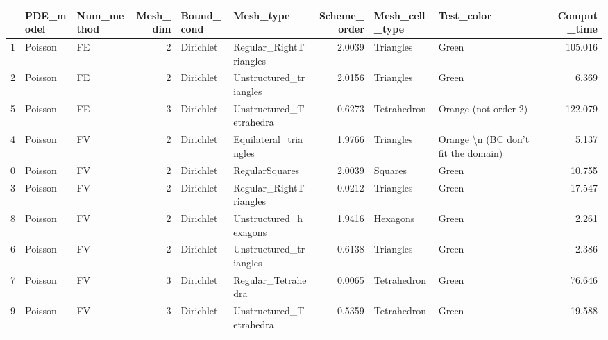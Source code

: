 \begin{tabular}{lllrllrllr}
\toprule
{} & PDE\_model & Num\_method &  Mesh\_dim & Bound\_cond &                Mesh\_type &  Scheme\_order & Mesh\_cell\_type &                           Test\_color &  Comput\_time \\
\midrule
1 &   Poisson &         FE &         2 &  Dirichlet &   Regular\_RightTriangles &        2.0039 &      Triangles &                                Green &      105.016 \\
2 &   Poisson &         FE &         2 &  Dirichlet &   Unstructured\_triangles &        2.0156 &      Triangles &                                Green &        6.369 \\
5 &   Poisson &         FE &         3 &  Dirichlet &  Unstructured\_Tetrahedra &        0.6273 &    Tetrahedron &                 Orange (not order 2) &      122.079 \\
4 &   Poisson &         FV &         2 &  Dirichlet &    Equilateral\_triangles &        1.9766 &      Triangles &  Orange \textbackslash n (BC don't fit the domain) &        5.137 \\
0 &   Poisson &         FV &         2 &  Dirichlet &           RegularSquares &        2.0039 &        Squares &                                Green &       10.755 \\
3 &   Poisson &         FV &         2 &  Dirichlet &   Regular\_RightTriangles &        0.0212 &      Triangles &                                Green &       17.547 \\
8 &   Poisson &         FV &         2 &  Dirichlet &    Unstructured\_hexagons &        1.9416 &       Hexagons &                                Green &        2.261 \\
6 &   Poisson &         FV &         2 &  Dirichlet &   Unstructured\_triangles &        0.6138 &      Triangles &                                Green &        2.386 \\
7 &   Poisson &         FV &         3 &  Dirichlet &       Regular\_Tetrahedra &        0.0065 &    Tetrahedron &                                Green &       76.646 \\
9 &   Poisson &         FV &         3 &  Dirichlet &  Unstructured\_Tetrahedra &        0.5359 &    Tetrahedron &                                Green &       19.588 \\
\bottomrule
\end{tabular}

